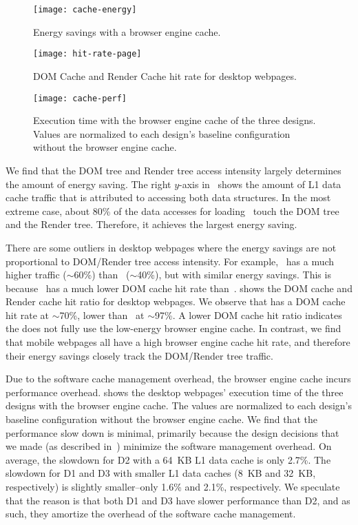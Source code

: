\begin{figure}[t]
\centering
\texttt{[image: cache-energy]}
\caption{\small{Energy savings with a browser engine cache.}}
\label{fig:cache-energy}
\end{figure}

\begin{figure}[t]
\centering
\texttt{[image: hit-rate-page]}
\caption{\small{DOM Cache and Render Cache hit rate for desktop webpages.}}
\label{fig:hit-rate-page}
\end{figure}

\begin{figure}[t]
\centering
\captionsetup{width=.9\columnwidth}
\texttt{[image: cache-perf]}
\caption{\small{Execution time with the browser engine cache of the three designs. Values are normalized to each design's baseline configuration without the browser engine cache.}}
\label{fig:cache-perf}
\end{figure}

We find that the DOM tree and Render tree access intensity largely determines the amount of energy saving. The right $y$-axis in~ shows the amount of L1 data cache traffic that is attributed to accessing both data structures. In the most extreme case, about 80\% of the data accesses for loading~ touch the DOM tree and the Render tree. Therefore, it achieves the largest energy saving.

There are some outliers in desktop webpages where the energy savings are not proportional to DOM/Render tree access intensity. For example,~ has a much higher traffic ($\sim$60\%) than~ ($\sim$40\%), but with similar energy savings. This is because~ has a much lower DOM cache hit rate than~.  shows the DOM cache and Render cache hit ratio for desktop webpages. We observe that  has a DOM cache hit rate at $\sim$70\%, lower than~ at $\sim$97\%. A lower DOM cache hit ratio indicates the  does not fully use the low-energy browser engine cache. In contrast, we find that mobile webpages all have a high browser engine cache hit rate, and therefore their energy savings closely track the DOM/Render tree traffic.

Due to the software cache management overhead, the browser engine cache incurs performance overhead.  shows the desktop webpages' execution time of the three designs with the browser engine cache. The values are normalized to each design's baseline configuration without the browser engine cache. We find that the performance slow down is minimal, primarily because the design decisions that we made (as described in~) minimize the software management overhead. On average, the slowdown for D2 with a 64~KB L1 data cache is only 2.7\%. The slowdown for D1 and D3 with smaller L1 data caches (8~KB and 32~KB, respectively) is slightly smaller--only 1.6\% and 2.1\%, respectively. We speculate that the reason is that both D1 and D3 have slower performance than D2, and as such, they amortize the overhead of the software cache management.

